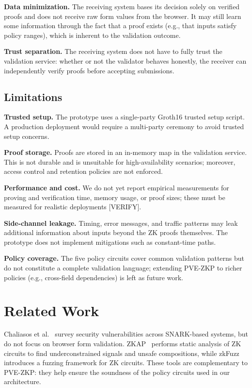 \documentclass[conference]{IEEEtran}
\begin{document}
\textbf{Data minimization.} The receiving system bases its decision solely on
verified proofs and does not receive raw form values from the browser. It may
still learn some information through the fact that a proof exists (e.g., that
inputs satisfy policy ranges), which is inherent to the validation outcome.

\textbf{Trust separation.} The receiving system does not have to fully trust the
validation service: whether or not the validator behaves honestly, the receiver
can independently verify proofs before accepting submissions.

\subsection{Limitations}

\textbf{Trusted setup.} The prototype uses a single-party Groth16 trusted setup
script. A production deployment would require a multi-party ceremony to avoid
trusted setup concerns.

\textbf{Proof storage.} Proofs are stored in an in-memory map in the validation
service. This is not durable and is unsuitable for high-availability scenarios;
moreover, access control and retention policies are not enforced.

\textbf{Performance and cost.} We do not yet report empirical measurements for
proving and verification time, memory usage, or proof sizes; these must be
measured for realistic deployments [VERIFY].

\textbf{Side-channel leakage.} Timing, error messages, and traffic patterns may
leak additional information about inputs beyond the ZK proofs themselves. The
prototype does not implement mitigations such as constant-time paths.

\textbf{Policy coverage.} The five policy circuits cover common validation
patterns but do not constitute a complete validation language; extending PVE-ZKP
to richer policies (e.g., cross-field dependencies) is left as future work.

\section{Related Work}

Chaliasos et al.~\cite{chaliasos2024sok} survey security vulnerabilities across
SNARK-based systems, but do not focus on browser form validation. ZKAP~\cite{zkap}
performs static analysis of ZK circuits to find underconstrained signals and
unsafe compositions, while zkFuzz~\cite{zkfuzz} introduces a fuzzing framework
for ZK circuits. These tools are complementary to PVE-ZKP: they help ensure the
soundness of the policy circuits used in our architecture.
\end{document}
